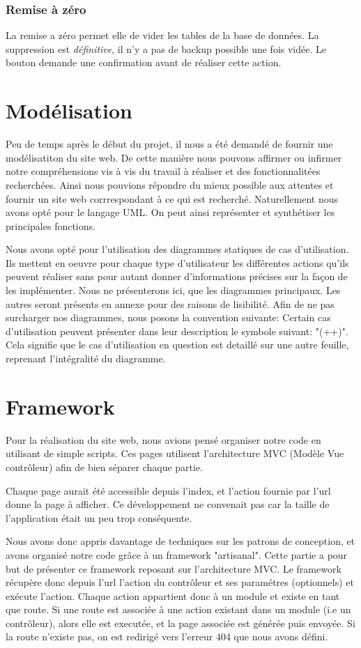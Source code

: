             \subsubsection{Remise à zéro}
La remise a zéro permet elle de vider les tables de la base de données. La suppression est \emph{définitive}, il n'y a pas de
backup possible une fois vidée. Le bouton demande une confirmation avant de réaliser cette action.

    \section{Modélisation}
Peu de temps après le début du projet, il nous a été demandé de fournir une modélisatiton du site web. De cette manière
nous pouvons affirmer ou infirmer notre compréhensions vis à vis du travail à réaliser et des fonctionnalitées recherchées.
Ainsi nous pouvions répondre du mieux possible aux attentes et fournir un site web corrrespondant à ce qui est recherché.
Naturellement nous avons opté pour le langage UML. On peut ainsi représenter et synthétiser les principales fonctions.

Nous avons opté pour l'utilisation des diagrammes statiques de cas d'utilisation. Ils mettent en oeuvre pour chaque type d'utilisateur les différentes actions qu'ils peuvent réaliser sans pour autant donner d'informations précises sur la façon de les implémenter.
Nous ne présenterons ici, que les diagrammes principaux. Les autres seront présents en annexe pour des raisons de lisibilité.
Afin de ne pas surcharger nos diagrammes, nous posons la convention suivante: Certain cas d'utilisation peuvent présenter 
dans leur description le symbole suivant: "(++)". Cela signifie que le cas d'utilisation en question est detaillé sur une autre feuille, reprenant l'intégralité du diagramme.

 
    \section{Framework}
Pour la réalisation du site web, nous avions pensé organiser notre code en utilisant de simple scripts.
Ces pages utilisent l'architecture MVC (Modèle Vue contrôleur) afin de bien séparer chaque partie.

Chaque page aurait été accessible depuis l'index, et l'action fournie par l'url donne la page à afficher.
Ce développement ne convenait pas car la taille de l'application était un peu trop conséquente.

Nous avons donc appris davantage de techniques sur les patrons de conception, et avons organisé notre code
grâce à un framework "artisanal". Cette partie a pour but de présenter ce framework reposant sur l'architecture MVC.
Le framework récupère donc depuis l'url l'action du contrôleur et ses paramétres (optionnels) et exécute l'action.
Chaque action appartient donc à un module et existe en tant que route. Si une route est associée à une action existant dans
un module (i.e un contrôleur), alors elle est executée, et la page associée est générée puis envoyée.
Si la route n'existe pas, on est redirigé vers l'erreur 404 que nous avons défini.

